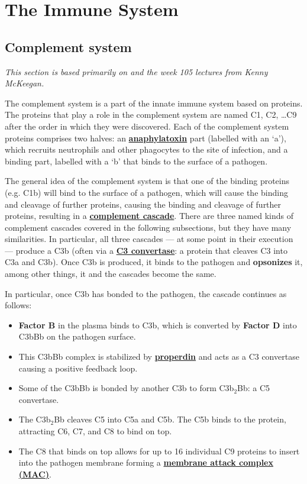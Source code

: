 \chapter{The Immune System}

\section{Complement system}

\textit{This section is based primarily on \cite{DaveComplementSystem} and the week 105 lectures from Kenny McKeegan.}

The complement system is a part of the innate immune system based on proteins. The proteins that play a role in the complement system are named C1, C2, \ldots C9 after the order in which they were discovered. Each of the complement system proteins comprises two halves: an \href{https://en.wikipedia.org/wiki/Anaphylatoxin}{\textbf{anaphylatoxin}} part (labelled with an `a'), which recruits neutrophils and other phagocytes to the site of infection, and a binding part, labelled with a `b' that binds to the surface of a pathogen. 

The general idea of the complement system is that one of the binding proteins (e.g. C1b) will bind to the surface of a pathogen, which will cause the binding and cleavage of further proteins, causing the binding and cleavage of further proteins, resulting in a \href{https://en.wikipedia.org/wiki/Complement_system}{\textbf{complement cascade}}. There are three named kinds of complement cascades covered in the following subsections, but they have many similarities. In particular, all three cascades --- at some point in their execution --- produce a C3b (often via a \href{https://en.wikipedia.org/wiki/C3-convertase}{\textbf{C3 convertase}}: a protein that cleaves C3 into C3a and C3b). Once C3b is produced, it binds to the pathogen and \textbf{opsonizes} it, among other things, it and the cascades become the same.

In particular, once C3b has bonded to the pathogen, the cascade continues as follows:

\begin{itemize}
    \item \textbf{Factor B} in the plasma binds to C3b, which is converted by \textbf{Factor D} into C3bBb on the pathogen surface.
    \item This C3bBb complex is stabilized by \href{https://en.wikipedia.org/wiki/Properdin}{\textbf{properdin}} and acts as a C3 convertase causing a positive feedback loop.
    \item Some of the C3bBb is bonded by another C3b to form C3b\({}_2\)Bb: a C5 convertase.
    \item The C3b\({}_2\)Bb cleaves C5 into C5a and C5b. The C5b binds to the protein, attracting C6, C7, and C8 to bind on top.
    \item The C8 that binds on top allows for up to 16 individual C9 proteins to insert into the pathogen membrane forming a \href{https://en.wikipedia.org/wiki/Complement_membrane_attack_complex}{\textbf{membrane attack complex (MAC)}}.
\end{itemize}


